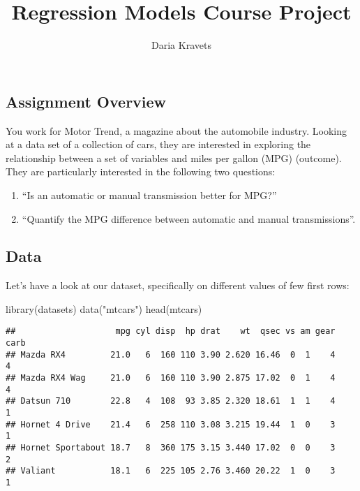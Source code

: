 \documentclass[
]{article}
\title{Regression Models Course Project}
\author{Daria Kravets}
\date{}
\newenvironment{Shaded}{\begin{snugshade}}{\end{snugshade}}
\newcommand{\FunctionTok}[1]{\textcolor[rgb]{0.00,0.00,0.00}{#1}}
\newcommand{\NormalTok}[1]{#1}
\newcommand{\StringTok}[1]{\textcolor[rgb]{0.31,0.60,0.02}{#1}}
\begin{document}
\maketitle

\hypertarget{assignment-overview}{%
\subsection{Assignment Overview}\label{assignment-overview}}

You work for Motor Trend, a magazine about the automobile industry.
Looking at a data set of a collection of cars, they are interested in
exploring the relationship between a set of variables and miles per
gallon (MPG) (outcome). They are particularly interested in the
following two questions:

\begin{enumerate}
\def\labelenumi{\arabic{enumi}.}
\item
  ``Is an automatic or manual transmission better for MPG?''
\item
  ``Quantify the MPG difference between automatic and manual
  transmissions''.
\end{enumerate}

\hypertarget{data}{%
\subsection{Data}\label{data}}

Let's have a look at our dataset, specifically on different values of
few first rows:

\begin{Shaded}
\begin{Highlighting}[]
\FunctionTok{library}\NormalTok{(datasets)}
\FunctionTok{data}\NormalTok{(}\StringTok{"mtcars"}\NormalTok{)}
\FunctionTok{head}\NormalTok{(mtcars)}
\end{Highlighting}
\end{Shaded}

\begin{verbatim}
##                    mpg cyl disp  hp drat    wt  qsec vs am gear carb
## Mazda RX4         21.0   6  160 110 3.90 2.620 16.46  0  1    4    4
## Mazda RX4 Wag     21.0   6  160 110 3.90 2.875 17.02  0  1    4    4
## Datsun 710        22.8   4  108  93 3.85 2.320 18.61  1  1    4    1
## Hornet 4 Drive    21.4   6  258 110 3.08 3.215 19.44  1  0    3    1
## Hornet Sportabout 18.7   8  360 175 3.15 3.440 17.02  0  0    3    2
## Valiant           18.1   6  225 105 2.76 3.460 20.22  1  0    3    1
\end{verbatim}
\end{document}

